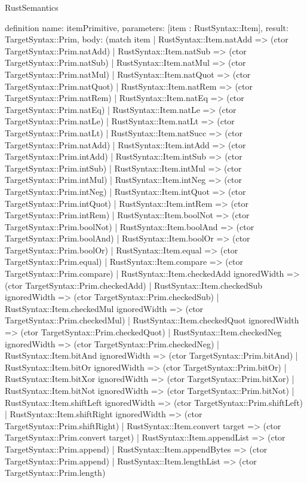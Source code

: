 \begin{lexlean}{RustSemantics}
\begin{semanticmodule}
definition{
  name: itemPrimitive,
  parameters: [item : RustSyntax::Item],
  result: TargetSyntax::Prim,
  body: (match item
    | RustSyntax::Item.natAdd => (ctor TargetSyntax::Prim.natAdd)
    | RustSyntax::Item.natSub => (ctor TargetSyntax::Prim.natSub)
    | RustSyntax::Item.natMul => (ctor TargetSyntax::Prim.natMul)
    | RustSyntax::Item.natQuot => (ctor TargetSyntax::Prim.natQuot)
    | RustSyntax::Item.natRem => (ctor TargetSyntax::Prim.natRem)
    | RustSyntax::Item.natEq => (ctor TargetSyntax::Prim.natEq)
    | RustSyntax::Item.natLe => (ctor TargetSyntax::Prim.natLe)
    | RustSyntax::Item.natLt => (ctor TargetSyntax::Prim.natLt)
    | RustSyntax::Item.natSucc => (ctor TargetSyntax::Prim.natAdd)
    | RustSyntax::Item.intAdd => (ctor TargetSyntax::Prim.intAdd)
    | RustSyntax::Item.intSub => (ctor TargetSyntax::Prim.intSub)
    | RustSyntax::Item.intMul => (ctor TargetSyntax::Prim.intMul)
    | RustSyntax::Item.intNeg => (ctor TargetSyntax::Prim.intNeg)
    | RustSyntax::Item.intQuot => (ctor TargetSyntax::Prim.intQuot)
    | RustSyntax::Item.intRem => (ctor TargetSyntax::Prim.intRem)
    | RustSyntax::Item.boolNot => (ctor TargetSyntax::Prim.boolNot)
    | RustSyntax::Item.boolAnd => (ctor TargetSyntax::Prim.boolAnd)
    | RustSyntax::Item.boolOr => (ctor TargetSyntax::Prim.boolOr)
    | RustSyntax::Item.equal => (ctor TargetSyntax::Prim.equal)
    | RustSyntax::Item.compare => (ctor TargetSyntax::Prim.compare)
    | RustSyntax::Item.checkedAdd ignoredWidth => (ctor TargetSyntax::Prim.checkedAdd)
    | RustSyntax::Item.checkedSub ignoredWidth => (ctor TargetSyntax::Prim.checkedSub)
    | RustSyntax::Item.checkedMul ignoredWidth => (ctor TargetSyntax::Prim.checkedMul)
    | RustSyntax::Item.checkedQuot ignoredWidth => (ctor TargetSyntax::Prim.checkedQuot)
    | RustSyntax::Item.checkedNeg ignoredWidth => (ctor TargetSyntax::Prim.checkedNeg)
    | RustSyntax::Item.bitAnd ignoredWidth => (ctor TargetSyntax::Prim.bitAnd)
    | RustSyntax::Item.bitOr ignoredWidth => (ctor TargetSyntax::Prim.bitOr)
    | RustSyntax::Item.bitXor ignoredWidth => (ctor TargetSyntax::Prim.bitXor)
    | RustSyntax::Item.bitNot ignoredWidth => (ctor TargetSyntax::Prim.bitNot)
    | RustSyntax::Item.shiftLeft ignoredWidth => (ctor TargetSyntax::Prim.shiftLeft)
    | RustSyntax::Item.shiftRight ignoredWidth => (ctor TargetSyntax::Prim.shiftRight)
    | RustSyntax::Item.convert target => (ctor TargetSyntax::Prim.convert target)
    | RustSyntax::Item.appendList => (ctor TargetSyntax::Prim.append)
    | RustSyntax::Item.appendBytes => (ctor TargetSyntax::Prim.append)
    | RustSyntax::Item.lengthList => (ctor TargetSyntax::Prim.length)
}
\end{semanticmodule}
\end{lexlean}
